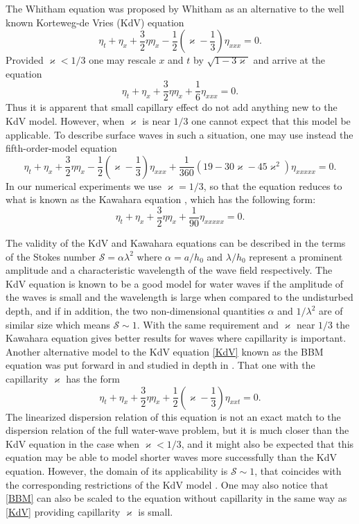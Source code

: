 The Whitham equation was proposed by Whitham \cite{Whitham1967} as an alternative to the
well known Korteweg-de Vries (KdV) equation
%
\begin{equation}
\label{KdV}
	\eta_t + \eta_x + \frac 32 \eta \eta_x
	- \frac 12 \left( \varkappa - \frac 13 \right) \eta_{xxx} = 0
	.
\end{equation}
%
Provided $\varkappa < 1/3$ one may rescale $x$ and $t$ by
$\sqrt{1 - 3 \varkappa}$ and arrive at the equation
%
\[
	\eta_t + \eta_x + \frac 32 \eta \eta_x
	+ \frac 16 \eta_{xxx} = 0
	.
\]
%
Thus it is apparent that small capillary effect do not add anything new
to the KdV model.
However, when $\varkappa$ is near $1/3$ one cannot expect
that this model be applicable.
To describe surface waves in such a situation, one may 
use instead the fifth-order-model equation
%
\begin{equation}
\label{Kawahara}
	\eta_t + \eta_x + \frac 32 \eta \eta_x
	- \frac 12 \left( \varkappa - \frac 13 \right) \eta_{xxx}
	+ \frac{1}{360} ( 19 - 30 \varkappa - 45 \varkappa^2 ) \eta_{xxxxx}
	= 0
	.
\end{equation}
%
In our numerical experiments we use $\varkappa = 1/3$, so that the equation
reduces to what is known as the Kawahara equation \citep{Biswas2009, Kawahara1972}, which 
has the following form:
%
\[
	\eta_t + \eta_x + \frac 32 \eta \eta_x
	+ \frac{1}{90} \eta_{xxxxx}
	= 0
	.
\]
%

The validity of the KdV and Kawahara equations can be described in the terms
of the Stokes number
\(
	\mathcal S = \alpha \lambda^2
\)
where $\alpha = a/h_0$ and $\lambda/h_0$ represent a prominent amplitude and
a characteristic wavelength of the wave field respectively.
The KdV equation is known to be a good model for water waves if the amplitude of 
the waves is small and the wavelength is large when compared to the undisturbed depth,
and if in addition, the two non-dimensional quantities $\alpha$ and 
$1 / \lambda^2$ are of similar size which means $\mathcal S \sim 1$.
With the same requirement and $\varkappa$ near $1/3$ the Kawahara
equation gives better results for waves where capillarity is important.
Another alternative model to the KdV equation \eqref{KdV} known as the BBM equation
was put forward in \cite{Peregrine1966} and studied in depth in \cite{Benjamin1972}.
That one with the capillarity $\varkappa$ has the form
%
\begin{equation}
\label{BBM}
	\eta_t + \eta_x + \frac 32 \eta \eta_x
	+ \frac 12 \left( \varkappa - \frac 13 \right) \eta_{xxt} = 0
	.
\end{equation}
%
The linearized dispersion relation 
of this equation is not an exact match to the dispersion relation of the full water-wave problem,
but it is much closer than the KdV equation in the case when $\varkappa < 1/3$, 
and it might also be expected that this equation may be able to model shorter waves more
successfully than the KdV equation.
However, the domain of its applicability is $\mathcal S \sim 1$,
that coincides with the corresponding
restrictions of the KdV model \cite{Benjamin1972}.
One may also notice that \eqref{BBM} can also be scaled
to the equation without capillarity in the same way as \eqref{KdV}
providing capillarity $\varkappa$ is small.


